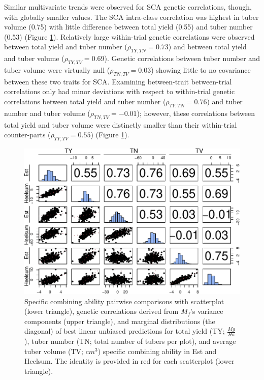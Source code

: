 Similar multivariate trends were observed for SCA genetic correlations, though, with globally smaller values. The SCA intra-class correlation was highest in tuber volume (0.75) with little difference between total yield (0.55) and tuber number (0.53) (Figure \ref{fig:sca-coef-full-pairs}). Relatively large within-trial genetic correlations were observed between total yield and tuber number (\(\rho_{TY,TN} = 0.73\)) and between total yield and tuber volume (\(\rho_{TY,TV} = 0.69\)). Genetic correlations between tuber number and tuber volume were virtually null (\(\rho_{TN,TV}=0.03\)) showing little to no covariance between these two traits for SCA. Examining between-trait between-trial correlations only had minor deviations with respect to within-trial genetic correlations between total yield and tuber number (\(\rho_{TY,TN}=0.76\)) and tuber number and tuber volume (\(\rho_{TN,TV}=-0.01\)); however, these correlations between total yield and tuber volume were distinctly smaller than their within-trial counter-parts (\(\rho_{TY,TV}=0.55\)) (Figure \ref{fig:sca-coef-full-pairs}).

\begin{figure}
\centering
\includegraphics[width=\linewidth]{./figs_02/Fig6.pdf}
\caption{\label{fig:sca-coef-full-pairs}Specific combining ability pairwise comparisons with scatterplot (lower triangle), genetic correlations derived from \(M_f\)'s variance components (upper triangle), and marginal distributions (the diagonal) of best linear unbiased predictions for total yield (TY; \(\frac{Mg}{Ha}\)), tuber number (TN; total number of tubers per plot), and average tuber volume (TV; \(cm^3\)) specific combining ability in Est and Heelsum. The identity is provided in red for each scatterplot (lower triangle).}
\end{figure}

